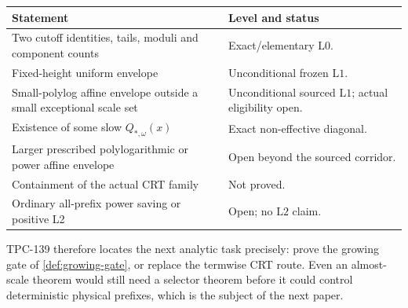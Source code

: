 \documentclass[11pt]{article}
\theoremstyle{definition}
\theoremstyle{remark}
\newcommand{\Lzero}{\mathrm{L0}}
\newcommand{\Lone}{\mathrm{L1}}
\newcommand{\Ltwo}{\mathrm{L2}}
\begin{document}
\begin{center}
\small
\begin{tabularx}{\textwidth}{@{}p{}X@{}}
\toprule
Statement & Level and status\\
\midrule
Two cutoff identities, tails, moduli and component counts
& Exact/elementary \(\Lzero\).\\
Fixed-height uniform envelope
& Unconditional frozen \(\Lone\).\\
Small-polylog affine envelope outside a small exceptional scale set
& Unconditional sourced \(\Lone\); actual eligibility open.\\
Existence of some slow \(Q_{*,\omega}(x)\)
& Exact non-effective diagonal.\\
Larger prescribed polylogarithmic or power affine envelope
& Open beyond the sourced corridor.\\
Containment of the actual CRT family
& Not proved.\\
Ordinary all-prefix power saving or positive L2
& Open; no \(\Ltwo\) claim.\\
\bottomrule
\end{tabularx}
\end{center}

TPC-139 therefore locates the next analytic task precisely: prove
the growing gate of \cref{def:growing-gate}, or replace the
termwise CRT route.  Even an almost-scale theorem would still need
a selector theorem before it could control deterministic physical
prefixes, which is the subject of the next paper.

\begingroup
\footnotesize
\raggedright


\endgroup
\end{document}
